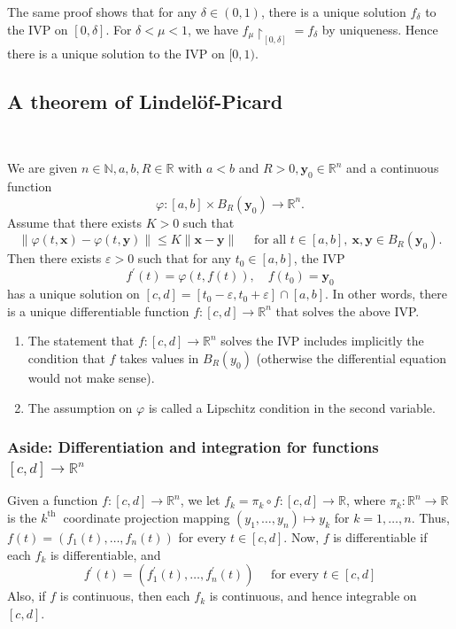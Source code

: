\documentclass[a4paper,11pt]{article}
\begin{document}
\begin{remark}
    The same proof shows that for any $\delta \in(0,1)$, there is a unique solution $f_\delta$ to the IVP on $[0, \delta]$. For $\delta<\mu<1$, we have $f_\mu\restriction_{[0, \delta]}=f_\delta$ by uniqueness. Hence there is a unique solution to the IVP on $[0,1)$.
\end{remark}

\subsection{A theorem of Lindel\"{o}f-Picard}\ \vspace{-1.5em}
\begin{theorem}\label{thm:21}
    We are given $n \in \mathbb{N}, a, b, R \in \mathbb{R}$ with $a<b$ and $R>0, \mathbf{y}_0 \in \mathbb{R}^n$ and a continuous function
    \[
    \varphi:[a, b] \times B_R\left(\mathbf{y}_0\right) \rightarrow \mathbb{R}^n.
    \]
    Assume that there exists $K>0$ such that
    \[
    \|\varphi(t, \mathbf x)-\varphi(t, \mathbf y)\| \leqslant K\|\mathbf x-\mathbf y\| \quad \text { for all } t \in[a, b],\ \mathbf x, \mathbf y \in B_R\left(\mathbf y_0\right).
    \]
    Then there exists $\varepsilon>0$ such that for any $t_0 \in[a, b]$, the IVP
    \[
    f^{\prime}(t)=\varphi(t, f(t)), \quad f(t_0)=\mathbf y_0
    \]
    has a unique solution on $[c, d]=\left[t_0-\varepsilon, t_0+\varepsilon\right] \cap[a, b]$. In other words, there is a unique differentiable function $f:[c, d] \rightarrow \mathbb{R}^n$ that solves the above IVP.
\end{theorem}
\begin{note}
    \begin{enumerate}
        \item The statement that $f:[c, d] \rightarrow \mathbb{R}^n$ solves the IVP includes implicitly the condition that $f$ takes values in $B_R\left(y_0\right)$ (otherwise the differential equation would not make sense).
        \item The assumption on $ \varphi $ is called a Lipschitz condition in the second variable.
    \end{enumerate}
\end{note}
\subsubsection*{Aside: Differentiation and integration for functions $ [c,d]\to \mathbb{R}^{n} $}
Given a function $f:[c, d] \rightarrow \mathbb{R}^n$, we let $f_k=\pi_k \circ f:[c, d] \rightarrow \mathbb{R}$, where $\pi_k: \mathbb{R}^n \rightarrow \mathbb{R}$ is the $k^{\text {th }}$ coordinate projection mapping $\left(y_1, \ldots, y_n\right) \mapsto y_k$ for $k=1, \ldots, n$. Thus, $f(t)=\left(f_1(t), \ldots, f_n(t)\right)$ for every $t \in[c, d]$.
Now, $f$ is differentiable if each $f_k$ is differentiable, and
\[
f^{\prime}(t)=\left(f_1^{\prime}(t), \ldots, f_n^{\prime}(t)\right) \quad \text { for every } t \in[c, d]
\]
Also, if $f$ is continuous, then each $f_k$ is continuous, and hence integrable on $[c, d]$. 
\end{document}

